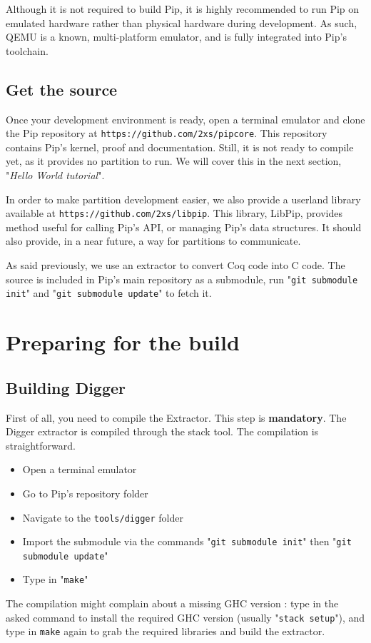 \documentclass[10pt,a4paper,titlepage]{refart}
\begin{document}
Although it is not required to build Pip, it is highly recommended to run Pip on emulated hardware rather than physical hardware during development. As such, QEMU is a known, multi-platform emulator, and is fully integrated into Pip's toolchain.

\subsection{Get the source}
Once your development environment is ready, open a terminal emulator and clone the Pip repository at \texttt{https://github.com/2xs/pipcore}.
This repository contains Pip's kernel, proof and documentation. Still,
it is not ready to compile yet, as it provides no partition to run. We
will cover this in the next section, "\textit{Hello World tutorial}".

In order to make partition development easier, we also provide a userland library available at \texttt{https://github.com/2xs/libpip}.
This library, LibPip, provides method useful for calling Pip's API, or managing Pip's data structures. It should also provide, in a near future, a way for partitions to communicate.

As said previously, we use an extractor to convert Coq code into C code. The source is included in Pip's main repository as a submodule, run "\texttt{git submodule init}" and "\texttt{git submodule update}" to fetch it.

\section{Preparing for the build}
\subsection{Building Digger}
First of all, you need to compile the Extractor. This step is \textbf{mandatory}.
The Digger extractor is compiled through the stack tool. The compilation is straightforward.
\begin{itemize}
\item Open a terminal emulator
\item Go to Pip's repository folder
\item Navigate to the \texttt{tools/digger} folder
\item Import the submodule via the commands "\texttt{git submodule init}" then "\texttt{git submodule update}"
\item Type in "\texttt{make}"
\end{itemize}
The compilation might complain about a missing GHC version : type in the asked command to install the required GHC version (usually "\texttt{stack setup}"), and type in \texttt{make} again to grab the required libraries and build the extractor. 
\end{document}
